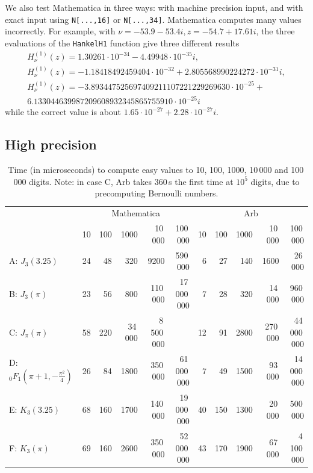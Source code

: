 \documentclass[review,nohypdvips]{siamart0216}
\begin{document}
We also test Mathematica in three ways: with machine precision input,
and with exact input using \texttt{N[...,16]} or \texttt{N[...,34]}.
Mathematica computes many values incorrectly. For example,
with $\nu=-53.9-53.4i, z = -54.7+17.61i$, the three evaluations
of the \texttt{HankelH1} function give three different results
\begin{equation*}
\begin{array}{c}
H^{(1)}_{\nu}(z) = 1.30261 \cdot 10^{-34} - 4.49948 \cdot 10^{-35} i, \\
H^{(1)}_{\nu}(z) = -1.18418492459404 \cdot 10^{-32} + 2.805568990224272 \cdot 10^{-31} i, \\
H^{(1)}_{\nu}(z) = -3.893447525697409211107221229269630 \cdot 10^{-25} + \\
6.133044639987209608932345865755910 \cdot 10^{-25} i
\end{array}
\end{equation*}
while the correct value is about $1.65 \cdot 10^{-27} + 2.28 \cdot 10^{-27} i$.

\subsection{High precision}

\begin{table}
\renewcommand{\arraystretch}{1.4}
\setlength{\tabcolsep}{.4em}
\begin{center}
\caption{Time (in microseconds) to compute easy values to
10, 100, 1000, 10\,000 and 100\,000 digits.
Note: in case C, Arb takes 360\,s the first time at $10^5$ digits, due to
precomputing Bernoulli numbers.}
\begin{scriptsize}
\begin{tabular}{l | r r r r r | r r r r r}
   &  \multicolumn{5}{|c|}{Mathematica}  &  \multicolumn{5}{|c}{Arb}    \\
  & 10 & 100 & 1000 & 10\,000 & 100\,000 & 10 & 100 & 1000 & 10\,000 & 100\,000 \\ \hline
A: $J_3(3.25)$ &
24 & 48 & 320 & 9200 & 590\,000 &
6 & 27 & 140 & 1600 & 26\,000 \\
B: $J_3(\pi)$ &
23 & 56 & 800 & 110\,000 & 17\,000\,000 &
7 & 28 & 320 & 14\,000 & 960\,000 \\
C: $J_{\pi}(\pi)$ &
58 & 220 & 34\,000 & 8\,500\,000 &  &
12 & 91 & 2800 & 270\,000 & 44\,000\,000 \\
D: ${}_0F_1(\pi\!+\!1,-\tfrac{\pi^2}{4})\!$ &
26 & 84 & 1800 & 350\,000 & 61\,000\,000 &
7 & 49 & 1500 & 93\,000 & 14\,000\,000 \\
E: $K_3(3.25)$ &
68 & 160 & 1700 & 140\,000 & 19\,000\,000 &
40 & 150 & 1300 & 20\,000 & 500\,000 \\
F: $K_3(\pi)$ &
69 & 160 & 2600 & 350\,000 & 52\,000\,000 &
43 & 170 & 1900 & 67\,000 & 4\,100\,000 \\
\end{tabular}
\label{tab:prectimings}
\end{scriptsize}
\end{center}
\end{table}
\end{document}
